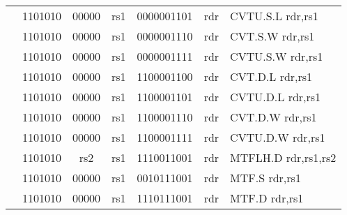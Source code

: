 \begin{table}[p]
\begin{small}
\begin{center}
\begin{tabular}{rcccccccccl}
&
\multicolumn{2}{|c|}{1101010} &
\multicolumn{1}{c|}{00000} &
\multicolumn{1}{c|}{rs1} &
\multicolumn{4}{c|}{0000001101} &
\multicolumn{1}{c|}{rdr} & CVTU.S.L rdr,rs1 \\
\cline{2-10}
  

&
\multicolumn{2}{|c|}{1101010} &
\multicolumn{1}{c|}{00000} &
\multicolumn{1}{c|}{rs1} &
\multicolumn{4}{c|}{0000001110} &
\multicolumn{1}{c|}{rdr} & CVT.S.W rdr,rs1 \\
\cline{2-10}
  

&
\multicolumn{2}{|c|}{1101010} &
\multicolumn{1}{c|}{00000} &
\multicolumn{1}{c|}{rs1} &
\multicolumn{4}{c|}{0000001111} &
\multicolumn{1}{c|}{rdr} & CVTU.S.W rdr,rs1 \\
\cline{2-10}
  

&
\multicolumn{2}{|c|}{1101010} &
\multicolumn{1}{c|}{00000} &
\multicolumn{1}{c|}{rs1} &
\multicolumn{4}{c|}{1100001100} &
\multicolumn{1}{c|}{rdr} & CVT.D.L rdr,rs1 \\
\cline{2-10}
  

&
\multicolumn{2}{|c|}{1101010} &
\multicolumn{1}{c|}{00000} &
\multicolumn{1}{c|}{rs1} &
\multicolumn{4}{c|}{1100001101} &
\multicolumn{1}{c|}{rdr} & CVTU.D.L rdr,rs1 \\
\cline{2-10}
  

&
\multicolumn{2}{|c|}{1101010} &
\multicolumn{1}{c|}{00000} &
\multicolumn{1}{c|}{rs1} &
\multicolumn{4}{c|}{1100001110} &
\multicolumn{1}{c|}{rdr} & CVT.D.W rdr,rs1 \\
\cline{2-10}
  

&
\multicolumn{2}{|c|}{1101010} &
\multicolumn{1}{c|}{00000} &
\multicolumn{1}{c|}{rs1} &
\multicolumn{4}{c|}{1100001111} &
\multicolumn{1}{c|}{rdr} & CVTU.D.W rdr,rs1 \\
\cline{2-10}
  

&
\multicolumn{2}{|c|}{1101010} &
\multicolumn{1}{c|}{rs2} &
\multicolumn{1}{c|}{rs1} &
\multicolumn{4}{c|}{1110011001} &
\multicolumn{1}{c|}{rdr} & MTFLH.D rdr,rs1,rs2 \\
\cline{2-10}
  

&
\multicolumn{2}{|c|}{1101010} &
\multicolumn{1}{c|}{00000} &
\multicolumn{1}{c|}{rs1} &
\multicolumn{4}{c|}{0010111001} &
\multicolumn{1}{c|}{rdr} & MTF.S rdr,rs1 \\
\cline{2-10}
  

&
\multicolumn{2}{|c|}{1101010} &
\multicolumn{1}{c|}{00000} &
\multicolumn{1}{c|}{rs1} &
\multicolumn{4}{c|}{1110111001} &
\multicolumn{1}{c|}{rdr} & MTF.D rdr,rs1 \\
\cline{2-10}
  


\end{tabular}
\end{center}
\end{small}
\end{table}
